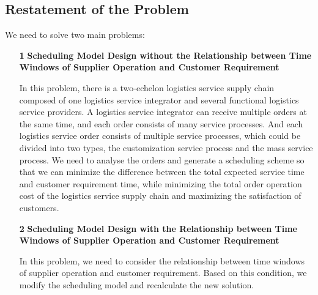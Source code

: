 \documentclass{llncs}
\begin{document}
    \subsection{Restatement of the Problem}
    We need to solve two main problems:
    
    \begin{itemize}
    \item[\textbf{1}] \textbf{Scheduling Model Design without the Relationship between Time Windows of Supplier Operation and Customer Requirement}
    
    In this problem, there is a two-echelon logistics service supply chain composed of one logistics service integrator and several functional logistics service providers. A logistics service integrator can receive multiple orders at the same time, and each order consists of many service processes. And each logistics service order consists of multiple service processes, which could be divided into two types, the customization service process and the mass service process. We need to analyse the orders and generate a scheduling scheme so that we can minimize the difference between the total expected service time and customer requirement time, while minimizing the total order operation cost of the logistics service supply chain and maximizing the satisfaction of customers.
    
    
    \item[\textbf{2}] \textbf{Scheduling Model Design with the Relationship between Time Windows of Supplier Operation and Customer Requirement}
    
    In this problem, we need to consider the relationship between time windows of supplier operation and customer requirement. Based on this condition, we modify the scheduling model and recalculate the new solution.
    \end{itemize}
\end{document}
